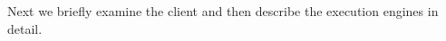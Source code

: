 
Next we briefly examine the \SeeDB client and then describe the execution engines
in detail.

% 


